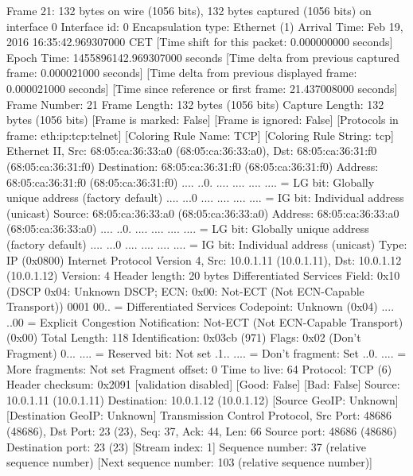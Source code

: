 Frame 21: 132 bytes on wire (1056 bits), 132 bytes captured (1056 bits) on interface 0
    Interface id: 0
    Encapsulation type: Ethernet (1)
    Arrival Time: Feb 19, 2016 16:35:42.969307000 CET
    [Time shift for this packet: 0.000000000 seconds]
    Epoch Time: 1455896142.969307000 seconds
    [Time delta from previous captured frame: 0.000021000 seconds]
    [Time delta from previous displayed frame: 0.000021000 seconds]
    [Time since reference or first frame: 21.437008000 seconds]
    Frame Number: 21
    Frame Length: 132 bytes (1056 bits)
    Capture Length: 132 bytes (1056 bits)
    [Frame is marked: False]
    [Frame is ignored: False]
    [Protocols in frame: eth:ip:tcp:telnet]
    [Coloring Rule Name: TCP]
    [Coloring Rule String: tcp]
Ethernet II, Src: 68:05:ca:36:33:a0 (68:05:ca:36:33:a0), Dst: 68:05:ca:36:31:f0 (68:05:ca:36:31:f0)
    Destination: 68:05:ca:36:31:f0 (68:05:ca:36:31:f0)
        Address: 68:05:ca:36:31:f0 (68:05:ca:36:31:f0)
        .... ..0. .... .... .... .... = LG bit: Globally unique address (factory default)
        .... ...0 .... .... .... .... = IG bit: Individual address (unicast)
    Source: 68:05:ca:36:33:a0 (68:05:ca:36:33:a0)
        Address: 68:05:ca:36:33:a0 (68:05:ca:36:33:a0)
        .... ..0. .... .... .... .... = LG bit: Globally unique address (factory default)
        .... ...0 .... .... .... .... = IG bit: Individual address (unicast)
    Type: IP (0x0800)
Internet Protocol Version 4, Src: 10.0.1.11 (10.0.1.11), Dst: 10.0.1.12 (10.0.1.12)
    Version: 4
    Header length: 20 bytes
    Differentiated Services Field: 0x10 (DSCP 0x04: Unknown DSCP; ECN: 0x00: Not-ECT (Not ECN-Capable Transport))
        0001 00.. = Differentiated Services Codepoint: Unknown (0x04)
        .... ..00 = Explicit Congestion Notification: Not-ECT (Not ECN-Capable Transport) (0x00)
    Total Length: 118
    Identification: 0x03cb (971)
    Flags: 0x02 (Don't Fragment)
        0... .... = Reserved bit: Not set
        .1.. .... = Don't fragment: Set
        ..0. .... = More fragments: Not set
    Fragment offset: 0
    Time to live: 64
    Protocol: TCP (6)
    Header checksum: 0x2091 [validation disabled]
        [Good: False]
        [Bad: False]
    Source: 10.0.1.11 (10.0.1.11)
    Destination: 10.0.1.12 (10.0.1.12)
    [Source GeoIP: Unknown]
    [Destination GeoIP: Unknown]
Transmission Control Protocol, Src Port: 48686 (48686), Dst Port: 23 (23), Seq: 37, Ack: 44, Len: 66
    Source port: 48686 (48686)
    Destination port: 23 (23)
    [Stream index: 1]
    Sequence number: 37    (relative sequence number)
    [Next sequence number: 103    (relative sequence number)]
